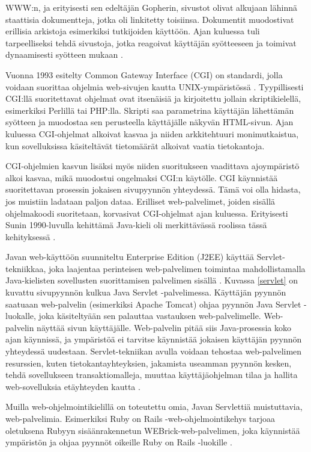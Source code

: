 WWW:n, ja erityisesti sen edeltäjän Gopherin, sivustot olivat alkujaan lähinnä staattisia dokumentteja, jotka oli linkitetty toisiinsa. Dokumentit muodostivat erillisia arkistoja esimerkiksi tutkijoiden käyttöön. Ajan kuluessa tuli tarpeelliseksi tehdä sivustoja, jotka reagoivat käyttäjän syötteeseen ja toimivat dynaamisesti syötteen mukaan \cite{dynamic}.

Vuonna 1993 esitelty Common Gateway Interface (CGI) on standardi, jolla voidaan suorittaa ohjelmia web-sivujen kautta UNIX-ympäristössä \cite{rfc3875}. Tyypillisesti CGI:llä suoritettavat ohjelmat ovat itsenäisiä ja kirjoitettu jollain skriptikielellä, esimerkiksi Perlillä tai PHP:lla. Skripti saa parametrina käyttäjän lähettämän syötteen ja muodostaa sen perusteella käyttäjälle näkyvän HTML-sivun. Ajan kuluessa CGI-ohjelmat alkoivat kasvaa ja niiden arkkitehtuuri monimutkaistua, kun sovelluksissa käsiteltävät tietomäärät alkoivat vaatia tietokantoja.

CGI-ohjelmien kasvun lisäksi myös niiden suoritukseen vaadittava ajoympäristö alkoi kasvaa, mikä muodostui ongelmaksi CGI:n käytölle. CGI käynnistää suoritettavan prosessin jokaisen sivupyynnön yhteydessä. Tämä voi olla hidasta, jos muistiin ladataan paljon dataa. Erilliset web-palvelimet, joiden sisällä ohjelmakoodi suoritetaan, korvasivat CGI-ohjelmat ajan kuluessa. Erityisesti Sunin 1990-luvulla kehittämä Java-kieli oli merkittävässä roolissa tässä kehityksessä \cite{uml}.

Javan web-käyttöön suunniteltu Enterprise Edition (J2EE) käyttää Serv\-let-tek\-niik\-kaa, joka laajentaa perinteisen web-palvelimen toimintaa mahdollistamalla Java-kielisten sovellusten suorittamisen palvelimen sisällä \cite{j2ee} . Kuvassa \ref{servlet} on kuvattu sivupyynnön kulkua Java Servlet -palvelimessa. Käyttäjän pyynnön saatuaan web-palvelin (esimerkiksi Apache Tomcat) ohjaa pyynnön Java Servlet -luokalle, joka käsiteltyään sen palauttaa vastauksen web-palvelimelle. Web-palvelin näyttää sivun käyttäjälle. Web-palvelin pitää siis Java-prosessia koko ajan käynnissä, ja ympäristöä ei tarvitse käynnistää jokaisen käyttäjän pyynnön yhteydessä uudestaan. Servlet-tekniikan avulla voidaan tehostaa web-palvelimen resurssien, kuten tietokantayhteyksien, jakamista useamman pyynnön kesken, tehdä sovellukseen transaktiomalleja, muuttaa käyttäjäohjelman tilaa ja hallita web-sovelluksia etäyhteyden kautta \cite{uml}.

Muilla web-ohjelmointikielillä on toteutettu omia, Javan Servlettiä muistuttavia, web-palvelimia. Esimerkiksi Ruby on Rails -web-ohjelmointikehys tarjoaa oletuksena Rubyyn sisäänrakennetun WEBrick-web-palvelimen, joka käynnistää ympäristön ja ohjaa pyynnöt oikeille Ruby on Rails -luokille \cite{ruby2011agile}.

